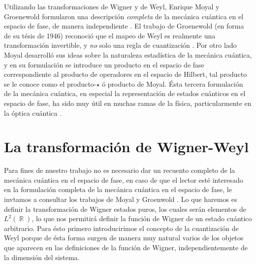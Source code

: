 \documentclass[a4paper]{report}
\DeclareMathOperator{\R}{\mathbb{R}}
\begin{document}
  Utilizando las transformaciones de Wigner y de Weyl,
  Enrique Moyal y Groenewold formularon una descripción
  \textit{completa} de la mecánica cuántica en el espacio de
  fase, de manera independiente \cite{curtright2012}.  El
  trabajo de Groenewold (en forma de su tésis de 1946)
  reconoció que el mapeo de Weyl es realmente una
  transformación invertible, y \textit{no} solo una regla de
  cuantización \cite{todorov2012}. Por otro lado Moyal
  desarrolló sus ideas sobre la naturaleza estadística de la
  mecánica cuántica, y en su formulación se introduce un
  producto en el espacio de fase correspondiente al producto
  de operadores en el espacio de Hilbert, tal producto se le
  conoce como el producto-$\star$ ó producto de Moyal. Ésta
  tercera formulación de la mecánica cuántica, en especial
  la representación de estados cuánticos en el espacio de
  fase, ha sido muy útil en muchas ramas de la física,
  particularmente en la óptica cuántica \cite{zachos2005}.

  \section{La transformación de Wigner-Weyl}

  Para fines de nuestro trabajo no es necesario dar un
  recuento completo de la mecánica cuántica en el espacio de
  fase, en caso de que el lector esté interesado en la
  formulación completa de la mecánica cuántica en el espacio
  de fase, le invtamos a consultar los trabajos de Moyal
  \cite{moyal1949} y Groenwold \cite{groenewold}. Lo que
  haremos es definir la transformación de Wigner estados
  puros, los cuales serán elementos de $L^2(\R)$, lo que nos
  permitirá definir la función de Wigner de un estado
  cuántico arbitrario. Para ésto primero introducirimos el
  concepto de la cuantización de Weyl porque de ésta forma
  surgen de manera muy natural varios de los objetos que
  aparecen en las definiciones de la función de Wigner,
  independientemente de la dimensión del sistema.
\end{document}
